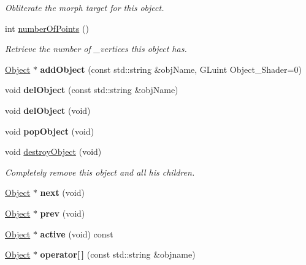 \begin{DoxyCompactItemize}
\begin{DoxyCompactList}\small\item\em Obliterate the morph target for this object. \end{DoxyCompactList}\item 
int \hyperlink{class_object_a73f1a6210bacf504de9a808009479b81}{number\-Of\-Points} ()
\begin{DoxyCompactList}\small\item\em Retrieve the number of \-\_\-vertices this object has. \end{DoxyCompactList}\item 
\hypertarget{class_scene_aa5a48614e959c38c35d824fa9d6a4b8b}{\hyperlink{class_object}{Object} $\ast$ {\bfseries add\-Object} (const std\-::string \&obj\-Name, G\-Luint Object\-\_\-\-Shader=0)}\label{class_scene_aa5a48614e959c38c35d824fa9d6a4b8b}

\item 
\hypertarget{class_scene_a2a6845dacbb468c5c097c7a6ab5a0fe0}{void {\bfseries del\-Object} (const std\-::string \&obj\-Name)}\label{class_scene_a2a6845dacbb468c5c097c7a6ab5a0fe0}

\item 
\hypertarget{class_scene_a2e6b319b60e27e66ad43bb942a6c4424}{void {\bfseries del\-Object} (void)}\label{class_scene_a2e6b319b60e27e66ad43bb942a6c4424}

\item 
\hypertarget{class_scene_ad6c9d1d1d0c786d39bf97dc60410e28b}{void {\bfseries pop\-Object} (void)}\label{class_scene_ad6c9d1d1d0c786d39bf97dc60410e28b}

\item 
\hypertarget{class_scene_a8c57e1cebc39586c7928225d1e25de39}{void \hyperlink{class_scene_a8c57e1cebc39586c7928225d1e25de39}{destroy\-Object} (void)}\label{class_scene_a8c57e1cebc39586c7928225d1e25de39}

\begin{DoxyCompactList}\small\item\em Completely remove this object and all his children. \end{DoxyCompactList}\item 
\hypertarget{class_scene_a70fcdad192a4c6ff508125de8af6cf4d}{\hyperlink{class_object}{Object} $\ast$ {\bfseries next} (void)}\label{class_scene_a70fcdad192a4c6ff508125de8af6cf4d}

\item 
\hypertarget{class_scene_ac852d5d763eb35b4908c9aa7ea54d1ae}{\hyperlink{class_object}{Object} $\ast$ {\bfseries prev} (void)}\label{class_scene_ac852d5d763eb35b4908c9aa7ea54d1ae}

\item 
\hypertarget{class_scene_ad0ea1a6bcf7815c63988bd937f06eb23}{\hyperlink{class_object}{Object} $\ast$ {\bfseries active} (void) const }\label{class_scene_ad0ea1a6bcf7815c63988bd937f06eb23}

\item 
\hypertarget{class_scene_ae9b69d8db8a46991017635f22e45baad}{\hyperlink{class_object}{Object} $\ast$ {\bfseries operator\mbox{[}$\,$\mbox{]}} (const std\-::string \&objname)}\label{class_scene_ae9b69d8db8a46991017635f22e45baad}

\end{DoxyCompactItemize}
